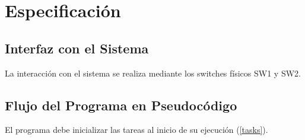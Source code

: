 \documentclass[a4paper,openright,12pt]{article}
\begin{document}
\section{Especificación}
\subsection{Interfaz con el Sistema}\label{design_button_translation}
La interacción con el sistema se realiza mediante los switches físicos SW1 y SW2. %

\subsection{Flujo del Programa en Pseudocódigo}\label{pseudo_program_flow}
El programa debe inicializar las tareas al inicio de su ejecución (\ref{tasks}).
\end{document}

